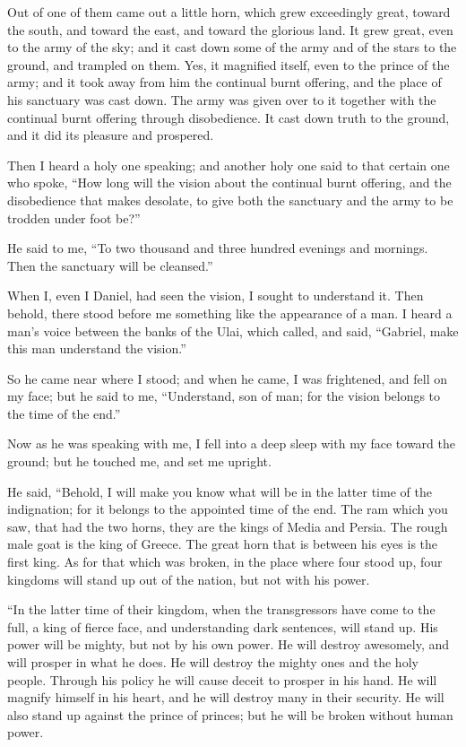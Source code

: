  Out of one of them came out a little horn, which grew
exceedingly great, toward the south, and toward the east, and toward the
glorious land.  It grew great, even to the army of the sky;
and it cast down some of the army and of the stars to the ground, and
trampled on them.  Yes, it magnified itself, even to the
prince of the army; and it took away from him the continual burnt
offering, and the place of his sanctuary was cast down. 
The army was given over to it together with the continual burnt offering
through disobedience. It cast down truth to the ground, and it did its
pleasure and prospered.

 Then I heard a holy one speaking; and another holy one
said to that certain one who spoke, ``How long will the vision about the
continual burnt offering, and the disobedience that makes desolate, to
give both the sanctuary and the army to be trodden under foot be?''

 He said to me, ``To two thousand and three hundred
evenings and mornings. Then the sanctuary will be cleansed.''

 When I, even I Daniel, had seen the vision, I sought to
understand it. Then behold, there stood before me something like the
appearance of a man.  I heard a man's voice between the
banks of the Ulai, which called, and said, ``Gabriel, make this man
understand the vision.''

 So he came near where I stood; and when he came, I was
frightened, and fell on my face; but he said to me, ``Understand, son of
man; for the vision belongs to the time of the end.''

 Now as he was speaking with me, I fell into a deep sleep
with my face toward the ground; but he touched me, and set me upright.

 He said, ``Behold, I will make you know what will be in
the latter time of the indignation; for it belongs to the appointed time
of the end.  The ram which you saw, that had the two horns,
they are the kings of Media and Persia.  The rough male
goat is the king of Greece. The great horn that is between his eyes is
the first king.  As for that which was broken, in the place
where four stood up, four kingdoms will stand up out of the nation, but
not with his power.

 ``In the latter time of their kingdom, when the
transgressors have come to the full, a king of fierce face, and
understanding dark sentences, will stand up.  His power
will be mighty, but not by his own power. He will destroy awesomely, and
will prosper in what he does. He will destroy the mighty ones and the
holy people.  Through his policy he will cause deceit to
prosper in his hand. He will magnify himself in his heart, and he will
destroy many in their security. He will also stand up against the prince
of princes; but he will be broken without human power.

